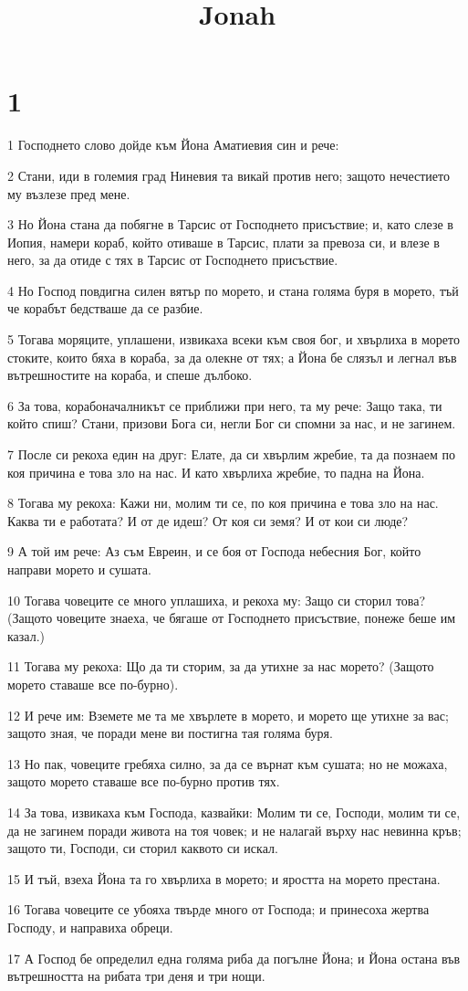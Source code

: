 

\title{Jonah}


\chapter{1}

\par 1 Господнето слово дойде към Йона Аматиевия син и рече:
\par 2 Стани, иди в големия град Ниневия та викай против него; защото нечестието му възлезе пред мене.
\par 3 Но Йона стана да побягне в Тарсис от Господнето присъствие; и, като слезе в Иопия, намери кораб, който отиваше в Тарсис, плати за превоза си, и влезе в него, за да отиде с тях в Тарсис от Господнето присъствие.
\par 4 Но Господ повдигна силен вятър по морето, и стана голяма буря в морето, тъй че корабът бедстваше да се разбие.
\par 5 Тогава моряците, уплашени, извикаха всеки към своя бог, и хвърлиха в морето стоките, които бяха в кораба, за да олекне от тях; а Йона бе слязъл и легнал във вътрешностите на кораба, и спеше дълбоко.
\par 6 За това, корабоначалникът се приближи при него, та му рече: Защо така, ти който спиш? Стани, призови Бога си, негли Бог си спомни за нас, и не загинем.
\par 7 После си рекоха един на друг: Елате, да си хвърлим жребие, та да познаем по коя причина е това зло на нас. И като хвърлиха жребие, то падна на Йона.
\par 8 Тогава му рекоха: Кажи ни, молим ти се, по коя причина е това зло на нас. Каква ти е работата? И от де идеш? От коя си земя? И от кои си люде?
\par 9 А той им рече: Аз съм Евреин, и се боя от Господа небесния Бог, който направи морето и сушата.
\par 10 Тогава човеците се много уплашиха, и рекоха му: Защо си сторил това? (Защото човеците знаеха, че бягаше от Господнето присъствие, понеже беше им казал.)
\par 11 Тогава му рекоха: Що да ти сторим, за да утихне за нас морето? (Защото морето ставаше все по-бурно).
\par 12 И рече им: Вземете ме та ме хвърлете в морето, и морето ще утихне за вас; защото зная, че поради мене ви постигна тая голяма буря.
\par 13 Но пак, човеците гребяха силно, за да се върнат към сушата; но не можаха, защото морето ставаше все по-бурно против тях.
\par 14 За това, извикаха към Господа, казвайки: Молим ти се, Господи, молим ти се, да не загинем поради живота на тоя човек; и не налагай върху нас невинна кръв; защото ти, Господи, си сторил каквото си искал.
\par 15 И тъй, взеха Йона та го хвърлиха в морето; и яростта на морето престана.
\par 16 Тогава човеците се убояха твърде много от Господа; и принесоха жертва Господу, и направиха обреци.
\par 17 А Господ бе определил една голяма риба да погълне Йона; и Йона остана във вътрешността на рибата три деня и три нощи.

